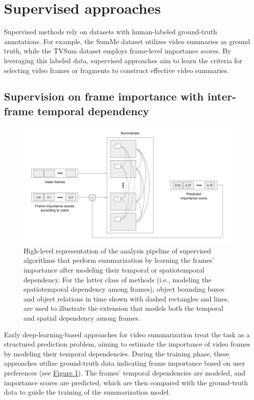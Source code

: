 \label{section:rel-supervised}
\section{Supervised approaches} 
	Supervised methods rely on datasets with human-labeled ground-truth annotations. For example, the SumMe dataset \cite{SumMe} utilizes video summaries as ground truth, while the TVSum dataset \cite{TVSum} employs frame-level importance scores. By leveraging this labeled data, supervised approaches aim to learn the criteria for selecting video frames or fragments to construct effective video summaries.

	\subsection{Supervision on frame importance with inter-frame temporal dependency}
	\label{subsec:rel-sup-temporal-dependency}

		\begin{figure}[ht]
			\centering
			\includegraphics[width=0.73\paperwidth]{content/related/figures/sup-model.png}
			\caption{ High-level representation of the analysis pipeline of supervised algorithms that perform summarization by learning the frames' importance after modeling their temporal or spatiotemporal dependency. For the latter class of methods (i.e., modeling the spatiotemporal dependency among frames), object bounding boxes and object relations in time shown with dashed rectangles and lines, are used to illustrate the extension that models both the temporal and spatial dependency among frames.}
			\label{figure:rel-sup-model}
		\end{figure}

		Early deep-learning-based approaches for video summarization treat the task as a structured prediction problem, aiming to estimate the importance of video frames by modeling their temporal dependencies. During the training phase, these approaches utilize ground-truth data indicating frame importance based on user preferences (see \hyperref[figure:rel-sup-model]{Figure \ref{figure:rel-sup-model}}). The frames' temporal dependencies are modeled, and importance scores are predicted, which are then compared with the ground-truth data to guide the training of the summarization model.
		

